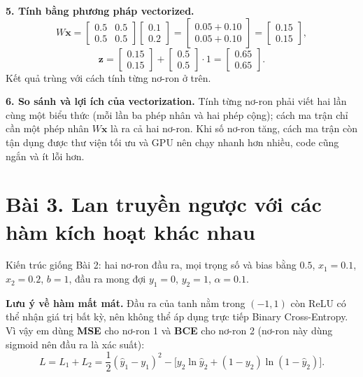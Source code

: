 \documentclass[a4paper,12pt]{article}
\begin{document}
\textbf{5. Tính bằng phương pháp vectorized.}
\[
W\mathbf{x} = \begin{bmatrix} 0.5 & 0.5 \\ 0.5 & 0.5 \end{bmatrix}
             \begin{bmatrix} 0.1 \\ 0.2 \end{bmatrix}
           = \begin{bmatrix} 0.05 + 0.10 \\ 0.05 + 0.10 \end{bmatrix}
           = \begin{bmatrix} 0.15 \\ 0.15 \end{bmatrix},
\]
\[
\mathbf{z} = \begin{bmatrix} 0.15 \\ 0.15 \end{bmatrix}
           + \begin{bmatrix} 0.5 \\ 0.5 \end{bmatrix}\cdot 1
           = \begin{bmatrix} 0.65 \\ 0.65 \end{bmatrix}.
\]
Kết quả trùng với cách tính từng nơ-ron ở trên.

\textbf{6. So sánh và lợi ích của vectorization.} Tính từng nơ-ron phải viết hai lần cùng một
biểu thức (mỗi lần ba phép nhân và hai phép cộng); cách ma trận chỉ cần một phép nhân
$W\mathbf{x}$ là ra cả hai nơ-ron. Khi số nơ-ron tăng, cách ma trận còn tận dụng được thư viện
tối ưu và GPU nên chạy nhanh hơn nhiều, code cũng ngắn và ít lỗi hơn.

\section*{Bài 3. Lan truyền ngược với các hàm kích hoạt khác nhau}

Kiến trúc giống Bài 2: hai nơ-ron đầu ra, mọi trọng số và bias bằng $0.5$,
$x_1 = 0.1$, $x_2 = 0.2$, $b = 1$, đầu ra mong đợi $y_1 = 0$, $y_2 = 1$, $\alpha = 0.1$.

\textbf{Lưu ý về hàm mất mát.} Đầu ra của tanh nằm trong $(-1,1)$ còn ReLU có thể nhận giá trị
bất kỳ, nên không thể áp dụng trực tiếp Binary Cross-Entropy. Vì vậy em dùng
\textbf{MSE} cho nơ-ron 1 và \textbf{BCE} cho nơ-ron 2 (nơ-ron này dùng sigmoid nên đầu ra là
xác suất):
\[ L = L_1 + L_2 = \frac{1}{2}(\hat{y}_1 - y_1)^2
   - \bigl[y_2\ln\hat{y}_2 + (1-y_2)\ln(1-\hat{y}_2)\bigr]. \]
\end{document}
